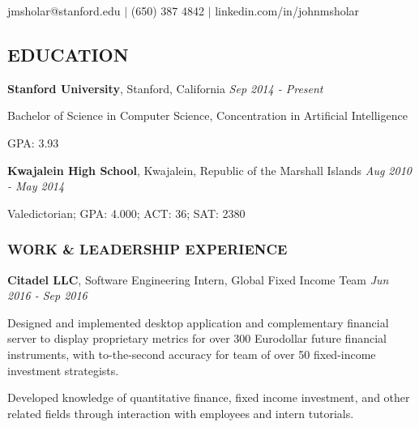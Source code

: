 \documentclass[11pt,letterpaper]{article}%
\begin{document}
\selectfont

\vspace{-1ex}
\centerline{jmsholar@stanford.edu $|$ (650) 387 4842 $|$ linkedin.com/in/johnmsholar}
\vspace{-1ex}

\hrulefill
\subsection*{EDUCATION}
\vspace{-1ex}
\hrulefill
\small

\hspace{.6em} 
{\bf Stanford University}, Stanford, California \hfill \textit{Sep 2014 - Present}

\hspace{1.2em} 
{Bachelor of Science} in Computer Science, Concentration in Artificial Intelligence 

\hspace{1.2em} 
GPA: 3.93

\hspace{.6em} 
{\bf Kwajalein High School}, Kwajalein, Republic of the Marshall Islands \hfill \textit{Aug 2010 - May 2014}

\hspace{1.2em} 
Valedictorian; GPA: 4.000; ACT: 36; SAT: 2380

\vspace{-.5em}
\hrulefill 
\subsubsection*{WORK \& LEADERSHIP EXPERIENCE}
\vspace{-1ex}
\hrulefill

\vspace{.3em}
\hspace{.6em} 
{\bf Citadel LLC}, Software Engineering Intern, Global Fixed Income Team \hfill \textit{Jun 2016 - Sep 2016}
\vspace{-.6em}
\begin{itemize*}
\item 
Designed and implemented desktop application and complementary financial server  to display proprietary metrics for over 300 Eurodollar future financial instruments, with to-the-second accuracy for team of over 50 fixed-income investment strategists.
\item
Developed knowledge of quantitative finance, fixed income investment, and other related fields through interaction with employees and intern tutorials.
\end{itemize*}
\end{document}
